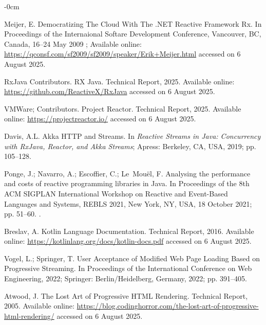 \documentclass[software,article,accept,pdftex,moreauthors]{Definitions/mdpi}
\begin{document}
\begin{adjustwidth}{-\extralength}{0cm}
\begin{thebibliography}{999}
Meijer, E.
\newblock Democratizing The Cloud With The .NET Reactive Framework Rx.
\newblock In Proceedings of the Internaional Softare Development Conference, Vancouver, BC, Canada, 16--24 May 2009 %
;  Available online: \url{https://qconsf.com/sf2009/sf2009/speaker/Erik+Meijer.html} accessed on 6 August 2025. %


RxJava Contributors.
\newblock RX Java.
\newblock Technical Report, 2025. Available online: \url{https://github.com/ReactiveX/RxJava} accessed on 6 August 2025.

VMWare; Contributors.
\newblock Project Reactor.
\newblock Technical Report, 2025. Available online: \url{https://projectreactor.io/} accessed on 6 August 2025.

Davis, A.L. Akka HTTP and Streams.
\newblock In {\em Reactive Streams in Java: Concurrency with RxJava, Reactor,
  and Akka Streams}; Apress: Berkeley, CA, USA, 2019; pp. 105--128.

Ponge, J.; Navarro, A.; Escoffier, C.; Le~Mou\"{e}l, F.
\newblock Analysing the performance and costs of reactive programming libraries
  in Java.
\newblock In Proceedings of the 8th ACM SIGPLAN
  International Workshop on Reactive and Event-Based Languages and Systems, REBLS 2021, New
  York, NY, USA, 18 October 2021; pp. 51–60.
.

Breslav, A.
\newblock Kotlin Language Documentation.
\newblock Technical Report, 2016. Available online: \url{https://kotlinlang.org/docs/kotlin-docs.pdf} accessed on 6 August 2025.

Vogel, L.; Springer, T.
\newblock User Acceptance of Modified Web Page Loading Based on Progressive
  Streaming.
\newblock In Proceedings of the International Conference on Web Engineering, 2022; %
  Springer:  Berlin/Heidelberg, Germany, %
 2022; pp. 391--405.

Atwood, J.
\newblock The Lost Art of Progressive HTML Rendering.
\newblock Technical Report, 2005.
  Available online: \url{https://blog.codinghorror.com/the-lost-art-of-progressive-html-rendering/} accessed on 6 August 2025.


\end{thebibliography}
\end{adjustwidth}
\end{document}
